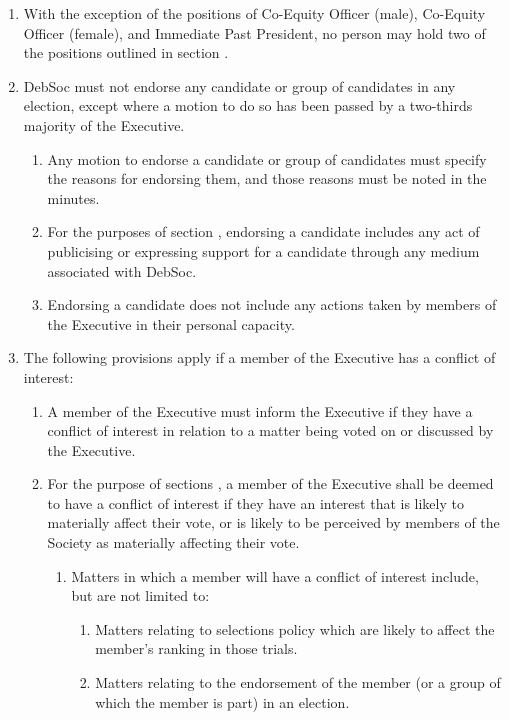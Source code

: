 \begin{enumerate}
\begin{enumerate}
  \end{enumerate}
\item With the exception of the positions of Co-Equity Officer (male), Co-Equity Officer (female), and Immediate Past President, no person may hold two of the positions outlined in section .
\item DebSoc must not endorse any candidate or group of candidates in any election, except where a motion to do so has been passed by a two-thirds majority of the Executive. \label{exec_endorsements}
  \begin{enumerate}
  \item Any motion to endorse a candidate or group of candidates must specify the reasons for endorsing them, and those reasons must be noted in the minutes.
  \item For the purposes of section , endorsing a candidate includes any act of publicising or expressing support for a candidate through any medium associated with DebSoc.
  \item Endorsing a candidate does not include any actions taken by members of the Executive in their personal capacity.
  \end{enumerate}
\item The following provisions apply if a member of the Executive has a conflict of interest: \label{coi_provisions}
  \begin{enumerate}
  \item A member of the Executive must inform the Executive if they have a conflict of interest in relation to a matter being voted on or discussed by the Executive.
  \item For the purpose of sections , a member of the Executive shall be deemed to have a conflict of interest if they have an interest that is likely to materially affect their vote, or is likely to be perceived by members of the Society as materially affecting their vote.
    \begin{enumerate}
    \item Matters in which a member will have a conflict of interest include, but are not limited to:
      \begin{enumerate}
      \item Matters relating to selections policy which are likely to affect the member’s ranking in those trials.
      \item Matters relating to the endorsement of the member (or a group of which the member is part) in an election.

\end{enumerate}
\end{enumerate}
\end{enumerate}
\end{enumerate}
